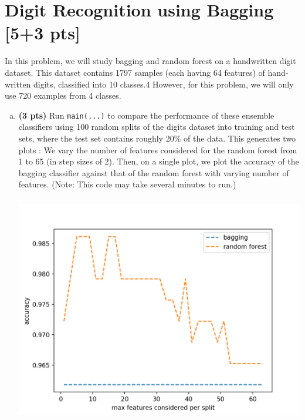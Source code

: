 \documentclass[11pt]{article}
\begin{document}
\section{Digit Recognition using Bagging [5+3 pts]}

In this problem, we will study bagging and random forest on a handwritten digit dataset. This dataset contains 1797 samples (each having 64 features) of hand-written digits, classified into 10 classes.4 However, for this problem, we will only use 720 examples from 4 classes.

\begin{enumerate}[(a)]
	\item \textbf{(3 pts)} Run \verb+main(...)+ to compare the performance of these ensemble classifiers using 100 random splits of the digits dataset into training and test sets, where the test set contains roughly 20\% of the data. This generates two plots : 
We vary the number of features considered for the random forest from 1 to 65 (in step sizes of 2). Then, on a single plot, we plot the accuracy of the bagging classifier against that of the random forest with varying number of features. (Note: This code may take several minutes to run.)

\begin{center}
\includegraphics[width = 15cm, height = 10cm]{bag_vs_rf.png}
\end{center}


\end{enumerate}
\end{document}
